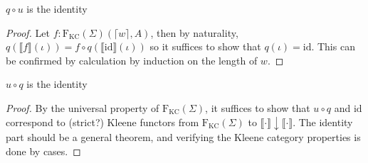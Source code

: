 \documentclass[acmsmall,anonymous,review,screen]{acmart}
\newcommand{\FKC}{\textrm{F}_{\textrm{KC}}}
\newcommand{\sem}[1]{\llbracket{#1}\rrbracket}
\newcommand{\id}{\textrm{id}}
\begin{document}
\begin{lemma}
  $q \circ u$ is the identity
\end{lemma}
\begin{proof}
  Let $f : \FKC(\Sigma)(\lceil w \rceil, A)$, then by naturality,
  $q(\sem{f}(\iota)) = f \circ q(\sem{\id}(\iota))$ so it suffices to
  show that $q(\iota) = \id$. This can be confirmed by calculation by
  induction on the length of $w$.
\end{proof}

\begin{lemma}
  $u \circ q$ is the identity
\end{lemma}
\begin{proof}
  By the universal property of $\FKC(\Sigma)$, it suffices to show
  that $u \circ q$ and $\id$ correspond to (strict?) Kleene functors
  from $\FKC(\Sigma)$ to $\sem{\cdot} \downarrow \sem{\cdot}$. The
  identity part should be a general theorem, and verifying the Kleene
  category properties is done by cases.
\end{proof}
\end{document}
